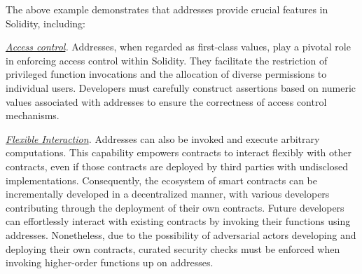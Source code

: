 The above example demonstrates that addresses provide crucial features in Solidity, including:
  
\noindent
\textit{\underline{Access control}.} 
Addresses, when regarded as first-class values, play a pivotal role in enforcing access control within Solidity. 
They facilitate the restriction of privileged function invocations and the allocation of diverse permissions to individual users. 
Developers must carefully construct assertions based on numeric values associated with addresses to ensure the correctness of access control mechanisms.

\noindent
\textit{\underline{Flexible Interaction}.} 
Addresses can also be invoked and execute arbitrary computations. 
This capability empowers contracts to interact flexibly with other contracts, even if those contracts are deployed by third parties with undisclosed implementations. 
Consequently, the ecosystem of smart contracts can be incrementally developed in a decentralized manner, with various developers contributing through the deployment of their own contracts. 
Future developers can effortlessly interact with existing contracts by invoking their functions using addresses. 
Nonetheless, due to the possibility of adversarial actors developing and deploying their own contracts, curated security checks must be enforced when invoking higher-order functions up on addresses.








